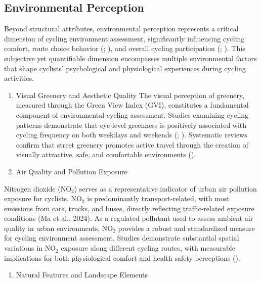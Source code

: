 \documentclass[
  12pt,
  oneside]{book}
\providecommand{\tightlist}{%
  \setlength{\itemsep}{0pt}\setlength{\parskip}{0pt}}
\begin{document}
\subsection{Environmental Perception}\label{environmental-perception}

Beyond structural attributes, environmental perception represents a critical dimension of cycling environment assessment, significantly influencing cycling comfort, route choice behavior (\textcite{broach_where_2012}; \textcite{sener_analysis_2009}), and overall cycling participation (\textcite{winters_motivators_2011}; \textcite{aldred_investigating_2015}). This subjective yet quantifiable dimension encompasses multiple environmental factors that shape cyclists' psychological and physiological experiences during cycling activities.

\begin{enumerate}
\def\labelenumi{\arabic{enumi}.}
\item
  Visual Greenery and Aesthetic Quality
  The visual perception of greenery, measured through the Green View Index (GVI), constitutes a fundamental component of environmental cycling assessment. Studies examining cycling patterns demonstrate that eye-level greenness is positively associated with cycling frequency on both weekdays and weekends (\textcite{lu_effect_2018}; \textcite{bai_exploring_2023}). Systematic reviews confirm that street greenery promotes active travel through the creation of visually attractive, safe, and comfortable environments (\textcite{nieuwenhuijsen_fifty_2017}).
\item
  Air Quality and Pollution Exposure
\end{enumerate}

Nitrogen dioxide (NO\(_2\)) serves as a representative indicator of urban air pollution exposure for cyclists. NO\(_2\) is predominantly transport-related, with most emissions from cars, trucks, and buses, directly reflecting traffic-related exposure conditions (Ma et al., 2024). As a regulated pollutant used to assess ambient air quality in urban environments, NO\(_2\) provides a robust and standardized measure for cycling environment assessment. Studies demonstrate substantial spatial variations in NO\(_2\) exposure along different cycling routes, with measurable implications for both physiological comfort and health safety perceptions (\textcite{an_impact_2018}).

\begin{enumerate}
\def\labelenumi{\arabic{enumi}.}
\setcounter{enumi}{2}
\tightlist
\item
  Natural Features and Landscape Elements
\end{enumerate}
\end{document}
